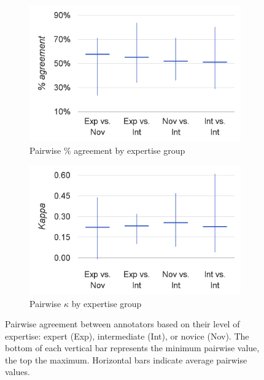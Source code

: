 			
		\begin{figure}[p]
			\centering

			\begin{subfigure}{.7\textwidth}
				\centering
				\includegraphics[width=\textwidth]{img/annotation/pairAgreeExpertise-noTitle}
				\caption{Pairwise \% agreement by expertise group}
				\label{fig:agreement:expertise:pct}
			\end{subfigure}%

			\vspace{2em}			
			
			\begin{subfigure}{.7\textwidth}
				\centering
				\includegraphics[width=\textwidth]{img/annotation/pairKappaExpertise-noTitle}
				\caption{Pairwise $\kappa$ by expertise group}
				\label{fig:agreement:expertise:k}
			\end{subfigure}%
			
			\vspace{1.5em}
					
			\caption[Pairwise agreement statistics by annotator expertise group]{Pairwise agreement between annotators based on their level of expertise: expert (Exp), intermediate (Int), or novice (Nov). 
			The bottom of each vertical bar represents the minimum pairwise value, the top the maximum. Horizontal bars indicate average pairwise values.
			}
			\label{fig:agreement:expertise}		

		\end{figure}
		
